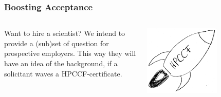 \begin{frame}
 \frametitle{Boosting Acceptance}
 \begin{columns}
   \begin{column}{.5\textwidth}
     Want to hire a scientist? \newline
     We intend to provide a (sub)set of question for prospective employers. This way they will have an idea of the background, if a solicitant waves a HPCCF-certificate.
   \end{column}
   \begin{column}{.5\textwidth}
       \centering
      \includegraphics[width=0.6\textwidth]{images/hpccf_boost}
    \end{column}
  \end{columns}
\end{frame}




